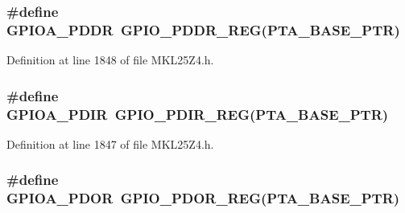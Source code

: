 \subsubsection[{\texorpdfstring{G\+P\+I\+O\+A\+\_\+\+P\+D\+DR}{GPIOA_PDDR}}]{\setlength{\rightskip}{0pt plus 5cm}\#define G\+P\+I\+O\+A\+\_\+\+P\+D\+DR~{\bf G\+P\+I\+O\+\_\+\+P\+D\+D\+R\+\_\+\+R\+EG}({\bf P\+T\+A\+\_\+\+B\+A\+S\+E\+\_\+\+P\+TR})}\hypertarget{group___g_p_i_o___register___accessor___macros_ga0e2be39e703dcb1fe73fba030d76b599}{}\label{group___g_p_i_o___register___accessor___macros_ga0e2be39e703dcb1fe73fba030d76b599}


Definition at line 1848 of file M\+K\+L25\+Z4.\+h.

\subsubsection[{\texorpdfstring{G\+P\+I\+O\+A\+\_\+\+P\+D\+IR}{GPIOA_PDIR}}]{\setlength{\rightskip}{0pt plus 5cm}\#define G\+P\+I\+O\+A\+\_\+\+P\+D\+IR~{\bf G\+P\+I\+O\+\_\+\+P\+D\+I\+R\+\_\+\+R\+EG}({\bf P\+T\+A\+\_\+\+B\+A\+S\+E\+\_\+\+P\+TR})}\hypertarget{group___g_p_i_o___register___accessor___macros_ga62064e1a5f0335045c827c9d92b4c374}{}\label{group___g_p_i_o___register___accessor___macros_ga62064e1a5f0335045c827c9d92b4c374}


Definition at line 1847 of file M\+K\+L25\+Z4.\+h.

\subsubsection[{\texorpdfstring{G\+P\+I\+O\+A\+\_\+\+P\+D\+OR}{GPIOA_PDOR}}]{\setlength{\rightskip}{0pt plus 5cm}\#define G\+P\+I\+O\+A\+\_\+\+P\+D\+OR~{\bf G\+P\+I\+O\+\_\+\+P\+D\+O\+R\+\_\+\+R\+EG}({\bf P\+T\+A\+\_\+\+B\+A\+S\+E\+\_\+\+P\+TR})}\hypertarget{group___g_p_i_o___register___accessor___macros_ga5c5a9a4e809579e68ae743d931312cc5}{}\label{group___g_p_i_o___register___accessor___macros_ga5c5a9a4e809579e68ae743d931312cc5}


